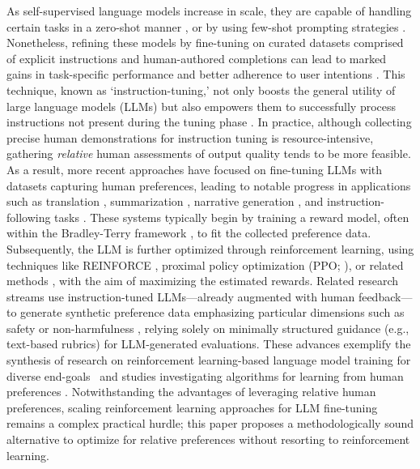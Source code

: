 As self-supervised language models increase in scale, they are capable of handling certain tasks in a zero-shot manner \citep{radford2019language}, or by using few-shot prompting strategies \citep{gpt3,megatron,chowdhery2022palm}. Nonetheless, refining these models by fine-tuning on curated datasets comprised of explicit instructions and human-authored completions can lead to marked gains in task-specific performance and better adherence to user intentions \citep{mishra-etal-2022-cross,sanh2022multitask,chung2022scaling,thoppilan2022lamda}. This technique, known as `instruction-tuning,' not only boosts the general utility of large language models (LLMs) but also empowers them to successfully process instructions not present during the tuning phase \citep{chung2022scaling}. In practice, although collecting precise human demonstrations for instruction tuning is resource-intensive, gathering \textit{relative} human assessments of output quality tends to be more feasible. As a result, more recent approaches have focused on fine-tuning LLMs with datasets capturing human preferences, leading to notable progress in applications such as translation \citep{kreutzer-etal-2018-reliability}, summarization \citep{stiennon2022learning,ziegler2020finetuning}, narrative generation \citep{ziegler2020finetuning}, and instruction-following tasks \citep{ouyang2022training,ramamurthy2023is}. These systems typically begin by training a reward model, often within the Bradley-Terry framework \citep{bradley1952rankanalysis}, to fit the collected preference data. Subsequently, the LLM is further optimized through reinforcement learning, using techniques like REINFORCE \citep{williams1992reinforce}, proximal policy optimization (PPO; \cite{schulman2017proximal}), or related methods \citep{ramamurthy2023is}, with the aim of maximizing the estimated rewards. Related research streams use instruction-tuned LLMs—already augmented with human feedback—to generate synthetic preference data emphasizing particular dimensions such as safety or non-harmfulness \citep{bai2022constitutional}, relying solely on minimally structured guidance (e.g., text-based rubrics) for LLM-generated evaluations. These advances exemplify the synthesis of research on reinforcement learning-based language model training for diverse end-goals~\citep{Ranzato2015SequenceLT,paulus2018a,wu2018learning} and studies investigating algorithms for learning from human preferences \citep{christiano2017deep,kupcsik2018learning}. Notwithstanding the advantages of leveraging relative human preferences, scaling reinforcement learning approaches for LLM fine-tuning remains a complex practical hurdle; this paper proposes a methodologically sound alternative to optimize for relative preferences without resorting to reinforcement learning.

